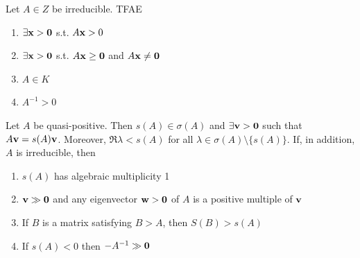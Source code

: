 \documentclass[aspectratio=169]{beamer}
\begin{document}
\begin{frame}
	\begin{theorem}
	\label{th:Fiedler2008_5_2_10}
	Let $A\in Z$ be irreducible. TFAE
	\begin{enumerate}
		\item $\exists\bx>\b0$ s.t. $A\mathbf{x}>0$
		\item $\exists\bx>\b0$ s.t. $A\bx\geq\b0$ and $A\bx\neq\b0$
		\item $A\in K$
		\item $A^{-1}>0$
	\end{enumerate}
	\end{theorem}
\end{frame}

\begin{frame}{\cite{Smith1995}}
	\begin{theorem}
		\label{th:Smith1995_4_3_2}
		Let $A$ be quasi-positive. Then $s(A)\in\sigma(A)$ and $\exists\bv>\b0$ such that $A\mathbf{v}=s(A)\mathbf{v}$.
		Moreover, $\Re\lambda<s(A)$ for all $\lambda\in\sigma(A)\setminus\{s(A)\}$. If, in addition, $A$ is irreducible, then
		\begin{enumerate}
			\item $s(A)$ has algebraic multiplicity 1
			\item $\bv\gg\b0$ and any eigenvector $\bw>\b0$ of $A$ is a positive multiple of $\mathbf{v}$
			\item If $B$ is a matrix satisfying $B>A$, then $S(B)>s(A)$
			\label{th:Smith1995_4_3_2_3}
			\item If $s(A)<0$ then $-A^{-1}\gg\b0$
		\end{enumerate}
	\end{theorem}
\end{frame}



\end{document}

